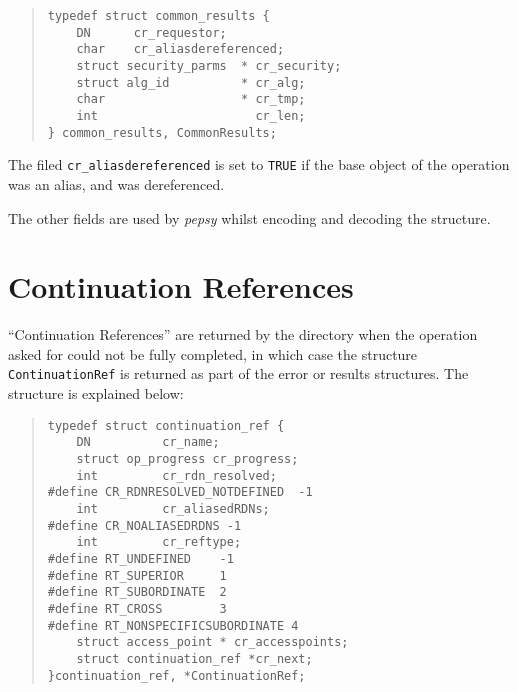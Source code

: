 \begin{quote}\small\begin{verbatim}
typedef struct common_results {
    DN      cr_requestor;
    char    cr_aliasdereferenced;
    struct security_parms  * cr_security;
    struct alg_id          * cr_alg;
    char                   * cr_tmp;
    int                      cr_len;
} common_results, CommonResults;
\end{verbatim}\end{quote}

The filed \verb"cr_aliasdereferenced" is set to \verb"TRUE" if the base
object of the operation was an alias, and was dereferenced.

The other fields are used by {\em pepsy} whilst encoding and decoding
the structure.

\section {Continuation References}
\label{cont_ref}

``Continuation References'' are returned by the directory when the operation
asked for could not be fully completed, in which case
the structure \verb"ContinuationRef" is returned as part of the error or
results structures.
The structure is explained below:

\begin{quote}\small\begin{verbatim}
typedef struct continuation_ref {
    DN          cr_name;
    struct op_progress cr_progress;
    int         cr_rdn_resolved;
#define CR_RDNRESOLVED_NOTDEFINED  -1
    int         cr_aliasedRDNs;
#define CR_NOALIASEDRDNS -1
    int         cr_reftype;
#define RT_UNDEFINED    -1
#define RT_SUPERIOR     1
#define RT_SUBORDINATE  2
#define RT_CROSS        3
#define RT_NONSPECIFICSUBORDINATE 4
    struct access_point * cr_accesspoints;
    struct continuation_ref *cr_next;
}continuation_ref, *ContinuationRef;
\end{verbatim}\end{quote}

